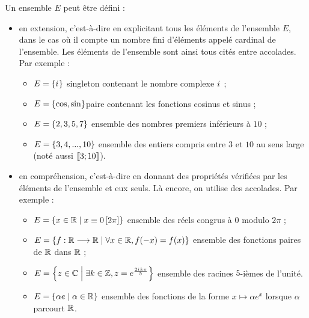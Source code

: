 \begin{defprop}
    Un ensemble \(E\) peut être défini :\\
    \begin{itemize}
        \item en extension, c’est-à-dire en explicitant tous les éléments de l’ensemble \(E\), dans le cas où
        il compte un nombre fini d’éléments appelé cardinal de l’ensemble. Les éléments de l’ensemble
        sont ainsi tous cités entre accolades.
        Par exemple :
        \begin{itemize}
            \item \(E = \left\lbrace i\mkern1mu\right\rbrace\) singleton contenant le nombre complexe \(i\mkern1mu\) ;
            \item \(E = \left\lbrace\cos, \sin\right\rbrace \)paire contenant les fonctions cosinus et sinus ;
            \item \(E = \left\lbrace2, 3, 5, 7\right\rbrace\) ensemble des nombres premiers inférieurs à \(10\) ;
            \item \(E = \left\lbrace3, 4, . . . , 10\right\rbrace\) ensemble des entiers compris entre \(3\) et \(10\) au sens large (noté aussi \(\left\llbracket3;10\right\rrbracket\)).
        \end{itemize}
        \item en compréhension, c’est-à-dire en donnant des propriétés vérifiées par les éléments de
        l’ensemble et eux seuls. Là encore, on utilise des accolades.
        Par exemple :\\
        \begin{itemize}
            \item \(E = \left\lbrace x \in \mathbb{R} \;\middle|\; x \equiv 0 \left[2\pi\right]\right\rbrace\) ensemble des réels congrus à \(0\) modulo \(2\pi\) ;
            \item \(E = \left\lbrace f : \mathbb{R} \longrightarrow \mathbb{R} \;\middle|\; \forall x \in \mathbb{R}, f (-x) = f (x)\right\rbrace\) ensemble des fonctions paires de \(\mathbb{R}\) dans \(\mathbb{R}\) ;
            \item \(E = \left\lbrace z \in \mathbb{C} \;\middle|\; \exists k \in \mathbb{Z}, z = e^{\frac{2i\mkern1mu k \pi}{5}}\right\rbrace\) ensemble des racines \(5\)-ièmes de l’unité.
            \item \(E = \left\lbrace\alpha e \;\middle|\; \alpha \in \mathbb{R}\right\rbrace\) ensemble des fonctions de la forme \(x \mapsto \alpha e^x\) lorsque \(\alpha\) parcourt \(\mathbb{R}\).
        \end{itemize}
    \end{itemize}
\end{defprop}

